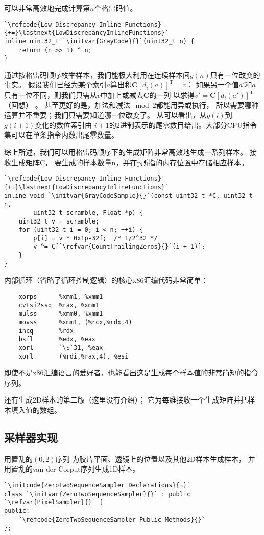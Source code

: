 可以非常高效地完成计算第$n$个格雷码值。
\begin{lstlisting}
`\refcode{Low Discrepancy Inline Functions}{+=}\lastnext{LowDiscrepancyInlineFunctions}`
inline uint32_t `\initvar{GrayCode}{}`(uint32_t n) {
    return (n >> 1) ^ n;
}
\end{lstlisting}

通过按格雷码顺序枚举样本，我们能极大利用在连续样本间$g(n)$只有一位改变的事实。
假设我们已经为某个索引$a$算出积${\bm C}[d_i(a)]^{\mathrm{T}}=v$：
如果另一个值$a'$和$a$只有一位不同，则我们只需从$v$中加上或减去$\bm C$的一列
以求得$v'={\bm C}[d_i(a')]^{\mathrm{T}}$（回想）
。
甚至更好的是，加法和减法$\mod{2}$都能用异或执行，
所以需要哪种运算并不重要；我们只需要知道哪一位改变了。
从可以看出，从$g(i)$到$g(i+1)$变化的数位索引由
$i+1$的2进制表示的尾零数目给出。大部分CPU指令集可以在单条指令内数出尾零数量。

综上所述，我们可以用格雷码顺序下的生成矩阵非常高效地生成一系列样本。
接收生成矩阵{\ttfamily C}，
要生成的样本数量{\ttfamily n}，并在{\ttfamily p}所指的内存位置中存储相应样本。
\begin{lstlisting}
`\refcode{Low Discrepancy Inline Functions}{+=}\lastnext{LowDiscrepancyInlineFunctions}`
inline void `\initvar{GrayCodeSample}{}`(const uint32_t *C, uint32_t n,
        uint32_t scramble, Float *p) {
    uint32_t v = scramble;
    for (uint32_t i = 0; i < n; ++i) {
        p[i] = v * 0x1p-32f;  /* 1/2^32 */
        v ^= C[`\refvar{CountTrailingZeros}{}`(i + 1)];
    }
}
\end{lstlisting}

内部循环（省略了循环控制逻辑）的核心x86汇编代码非常简单：
\begin{lstlisting}
    xorps      %xmm1, %xmm1
    cvtsi2ssq  %rax, %xmm1
    mulss      %xmm0, %xmm1
    movss      %xmm1, (%rcx,%rdx,4)
    incq       %rdx
    bsfl       %edx, %eax
    xorl       `\$`31, %eax
    xorl       (%rdi,%rax,4), %esi
\end{lstlisting}

即使不是x86汇编语言的爱好者，也能看出这是生成每个样本值的非常简短的指令序列。

还有生成2D样本的第二版（这里没有介绍）；
它为每维接收一个生成矩阵并把样本填入{}值的数组。

\subsection{采样器实现}\label{sub:采样器实现02}
用置乱的$(0,2)$序列
为胶片平面、透镜上的位置以及其他2D样本生成样本，
并用置乱的van der Corput序列生成1D样本。
\begin{lstlisting}
`\initcode{ZeroTwoSequenceSampler Declarations}{=}`
class `\initvar{ZeroTwoSequenceSampler}{}` : public `\refvar{PixelSampler}{}` {
public:
    `\refcode{ZeroTwoSequenceSampler Public Methods}{}`
};
\end{lstlisting}

